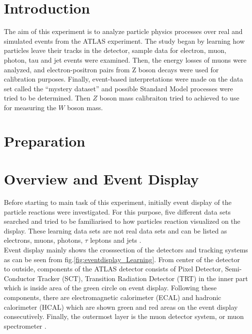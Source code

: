 \section{Introduction}
The aim of this experiment is to analyze particle physics processes over real and simulated events from the ATLAS experiment. The study began by learning how particles leave their tracks in the detector, sample data for electron, muon, photon, tau and jet events were examined. Then, the energy losses of muons were analyzed, and electron-positron pairs from Z boson decays were used for calibration purposes. Finally, event-based interpretations were made on the data set called the “mystery dataset” and possible Standard Model processes were tried to be determined. Then $Z$ boson mass calibraiton tried to achieved to use for measuring the $W$ boson mass.

\section{Preparation}

\section{Overview and Event Display}
\label{sec:eventdisplay}

Before starting to main task of this experiment, initially event display of the particle reactions were investigated. For this purpose, five different data sets searched and tried to be familiarised to how particles reaction visualized on the display. These learning data sets are not real data sets and can be listed as electrons, muons, photons, $\tau$ leptons and jets \cite{atlaslabmanual}. \\

Event display mainly shows the crosssection of the detectors and tracking systems as can be seen from fig.\ref{fig:eventdisplay_Learning}. From center of the detector to outside, components of the ATLAS detector consists of Pixel Detector, Semi-Conductor Tracker (SCT), Transition Radiation Detector (TRT) in the inner part which is inside area of the green circle on event display.
Following these components, there are electromagnetic calorimeter (ECAL) and hadronic calorimeter (HCAL) which are shown green and red areas on the event display consecutively. Finally, the outermost layer is the muon detector system, or muon spectrometer \cite{atlaslabmanual}.

